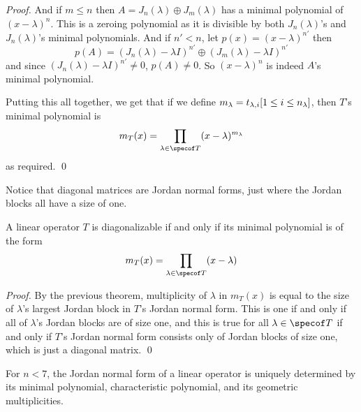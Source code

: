 \begin{proof}
        And if $m\leq n$ then $A=J_n(\lambda)\oplus J_m(\lambda)$ has a minimal polynomial of $(x-\lambda)^n$.
        This is a zeroing polynomial as it is divisible by both $J_n(\lambda)$'s and $J_n(\lambda)$'s minimal polynomials.
        And if $n'<n$, let $p(x)=(x-\lambda)^{n'}$ then
        \[ p(A) = (J_n(\lambda)-\lambda I)^{n'}\oplus(J_m(\lambda)-\lambda I)^{n'} \]
        and since $(J_n(\lambda)-\lambda I)^{n'}\neq0$, $p(A)\neq0$.
        So $(x-\lambda)^n$ is indeed $A$'s minimal polynomial.

        Putting this all together, we get that if we define $m_\lambda=\maxof{t_{\lambda,i}}[1\leq i\leq n_\lambda]$, then $T$'s minimal polynomial is
        \[ m_T(x) = \prod_{\lambda\in\specof T}(x-\lambda)^{m_\lambda} \]
        as required.
        \qed
    \eenum

\end{proof}

Notice that diagonal matrices are Jordan normal forms, just where the Jordan blocks all have a size of one.

\begin{thrm*}

    A linear operator $T$ is diagonalizable if and only if its minimal polynomial is of the form
    \[ m_T(x) = \prod_{\lambda\in\specof T}(x-\lambda) \]

\end{thrm*}

\begin{proof}

    By the previous theorem, multiplicity of $\lambda$ in $m_T(x)$ is equal to the size of $\lambda$'s largest Jordan block in $T$'s Jordan normal form.
    This is one if and only if all of $\lambda$'s Jordan blocks are of size one, and this is true for all $\lambda\in\specof T$ if and only if $T$'s Jordan normal form consists only of Jordan blocks of size
    one, which is just a diagonal matrix.
    \qed

\end{proof}

\begin{prop*}

    For $n<7$, the Jordan normal form of a linear operator is uniquely determined by its minimal polynomial, characteristic polynomial, and its geometric multiplicities.

\end{prop*}

